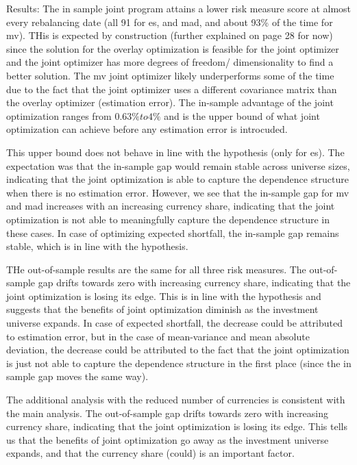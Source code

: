 Results: The in sample joint program attains a lower risk measure score at almost every rebalancing date (all 91 for es, and mad, and about 93\% of the time for mv). THis is expected by construction (further explained on page 28 for now) since the solution for the overlay optimization is feasible for the joint optimizer and the joint optimizer has more degrees of freedom/ dimensionality to find a better solution. The mv joint optimizer likely underperforms some of the time due to the fact that the joint optimizer uses a different covariance matrix than the overlay optimizer (estimation error). The in-sample advantage of the joint optimization ranges from $0.63\% to 4\%$ and is the upper bound of what joint optimization can achieve before any estimation error is introcuded. 

This upper bound does not behave in line with the hypothesis (only for es). The expectation was that the in-sample gap would remain stable across universe sizes, indicating that the joint optimization is able to capture the dependence structure when there is no estimation error. However, we see that the in-sample gap for mv and mad increases with an increasing currency share, indicating that the joint optimization is not able to meaningfully capture the dependence structure in these cases. In case of optimizing expected shortfall, the in-sample gap remains stable, which is in line with the hypothesis.

THe out-of-sample results are the same for all three risk measures. The out-of-sample gap drifts towards zero with increasing currency share, indicating that the joint optimization is losing its edge. This is in line with the hypothesis and suggests that the benefits of joint optimization diminish as the investment universe expands. In case of expected shortfall, the decrease could be attributed to estimation error, but in the case of mean-variance and mean absolute deviation, the decrease could be attributed to the fact that the joint optimization is just not able to capture the dependence structure in the first place (since the in sample gap moves the same way). 


The additional analysis with the reduced number of currencies is consistent with the main analysis. The out-of-sample gap drifts towards zero with increasing currency share, indicating that the joint optimization is losing its edge. This tells us that the benefits of joint optimization go away as the investment universe expands, and that the currency share (could) is an important factor. 

